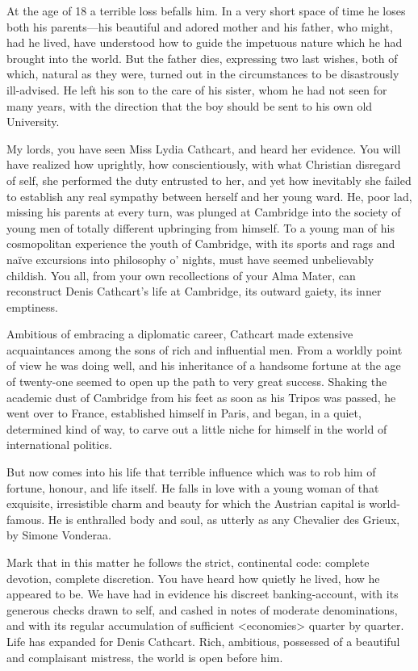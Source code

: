 \begin{dialogue}
At the age of 18 a terrible loss befalls him. In a very short space of time he loses both his parents—his beautiful and adored mother and his father, who might, had he lived, have understood how to guide the impetuous nature which he had brought into the world. But the father dies, expressing two last wishes, both of which, natural as they were, turned out in the circumstances to be disastrously ill-advised. He left his son to the care of his sister, whom he had not seen for many years, with the direction that the boy should be sent to his own old University.

My lords, you have seen Miss Lydia Cathcart, and heard her evidence. You will have realized how uprightly, how conscientiously, with what Christian disregard of self, she performed the duty entrusted to her, and yet how inevitably she failed to establish any real sympathy between herself and her young ward. He, poor lad, missing his parents at every turn, was plunged at Cambridge into the society of young men of totally different upbringing from himself. To a young man of his cosmopolitan experience the youth of Cambridge, with its sports and rags and naïve excursions into philosophy o' nights, must have seemed unbelievably childish. You all, from your own recollections of your Alma Mater, can reconstruct Denis Cathcart's life at Cambridge, its outward gaiety, its inner emptiness.

Ambitious of embracing a diplomatic career, Cathcart made extensive acquaintances among the sons of rich and influential men. From a worldly point of view he was doing well, and his inheritance of a handsome fortune at the age of twenty-one seemed to open up the path to very great success. Shaking the academic dust of Cambridge from his feet as soon as his Tripos was passed, he went over to France, established himself in Paris, and began, in a quiet, determined kind of way, to carve out a little niche for himself in the world of international politics.

But now comes into his life that terrible influence which was to rob him of fortune, honour, and life itself. He falls in love with a young woman of that exquisite, irresistible charm and beauty for which the Austrian capital is world-famous. He is enthralled body and soul, as utterly as any Chevalier des Grieux, by Simone Vonderaa.

Mark that in this matter he follows the strict, continental code: complete devotion, complete discretion. You have heard how quietly he lived, how  he appeared to be. We have had in evidence his discreet banking-account, with its generous checks drawn to self, and cashed in notes of moderate denominations, and with its regular accumulation of sufficient <economies> quarter by quarter. Life has expanded for Denis Cathcart. Rich, ambitious, possessed of a beautiful and complaisant mistress, the world is open before him.


\end{dialogue}
